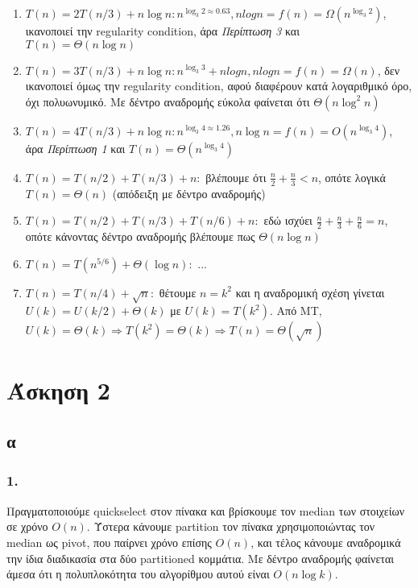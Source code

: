 \documentclass[12pt,a4paper]{article}
\begin{document}
    \begin{enumerate}
      \item \( T(n) = 2T(n/3) + n\log{n} : n^{\log_{3}2 \approx 0.63 }, 
      nlogn = f(n) = \Omega(n^{\log_{3}2}) \), ικανοποιεί την {\latintext 
      regularity condition}, άρα \textit{Περίπτωση 3} και \( T(n)=\Theta(n\log{n}) \)
      \item \( T(n) = 3T(n/3) + n\log{n} : n^{\log_{3}3} + nlogn, nlogn = 
      f(n) = \Omega(n) \), δεν ικανοποιεί όμως την {\latintext regularity 
      condition}, αφού διαφέρουν κατά λογαριθμικό όρο, όχι πολυωνυμικό. Με δέντρο 
      αναδρομής εύκολα φαίνεται ότι \( \Theta(n\log^{2}{n}) \)
      \item \( T(n) = 4T(n/3) + n\log{n} : n^{\log_{3}{4} \approx 1.26}, n\log{n} =
      f(n) = O(n^{\log_{3}4}) \), άρα \textit{Περίπτωση 1} και \( Τ(n) = 
      \Theta(n^{\log_{3}{4}}) \)
      \item \( T(n) = T(n/2) + T(n/3) + n : \) βλέπουμε ότι \( \frac{n}{2} + 
      \frac{n}{3} < n \), οπότε λογικά \( T(n) = \Theta(n) \) (απόδειξη με δέντρο
      αναδρομής)
      \item \( Τ(n) = T(n/2) + T(n/3) + T(n/6) + n : \) εδώ ισχύει \( \frac{n}{2} 
      + \frac{n}{3} + \frac{n}{6} = n \), οπότε κάνοντας δέντρο αναδρομής βλέπουμε
      πως \( \Theta(n\log{n}) \) 
      \item \( T(n) = T(n^{5/6}) + \Theta(\log{n}) : \) ...
      \item \( T(n) = T(n/4) + \sqrt{n} : \) θέτουμε \(n=k^2\) και η αναδρομική 
      σχέση γίνεται \( U(k) = U(k/2) + \Theta(k) \) με \( U(k)=T(k^2) \). Από 
      {\latintext MT}, \( U(k)=\Theta(k) \Rightarrow T(k^2)=\Theta(k) \Rightarrow 
      T(n)=\Theta(\sqrt{n}) \)
    \end{enumerate}

  \section{Άσκηση 2}

  \subsection{α}

  \subsubsection{1.}
    Πραγματοποιούμε {\latintext quickselect} στον πίνακα και βρίσκουμε τον
    {\latintext median} των στοιχείων σε χρόνο \( Ο(n) \).
    Ύστερα κάνουμε {\latintext partition} τον πίνακα χρησιμοποιώντας τον
    {\latintext median} ως {\latintext pivot}, που παίρνει χρόνο επίσης \( Ο(n) \), 
    και τέλος κάνουμε αναδρομικά την ίδια διαδικασία στα δύο {\latintext partitioned} 
    κομμάτια.
    Με δέντρο αναδρομής φαίνεται άμεσα ότι η πολυπλοκότητα του αλγορίθμου
    αυτού είναι \( Ο(n\log{k}) \).
\end{document}

